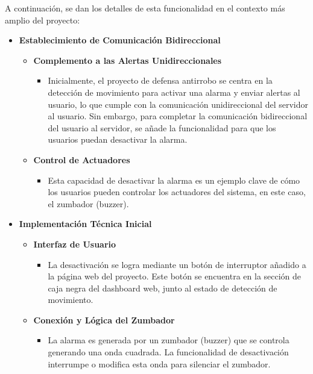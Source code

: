 \documentclass{report}
\begin{document}
A continuación, se dan los detalles de esta funcionalidad en el contexto más amplio del proyecto:
\begin{itemize}
    
    \item \textbf{Establecimiento de Comunicación Bidireccional}
    \begin{itemize}
        \item \textbf{Complemento a las Alertas Unidireccionales}
        \begin{itemize}
            \item Inicialmente, el proyecto de defensa antirrobo se centra en la detección de movimiento para activar una alarma y enviar alertas al usuario, 
            lo que cumple con la comunicación unidireccional del servidor al usuario. Sin embargo, para completar la comunicación bidireccional del usuario al 
            servidor, se añade la funcionalidad para que los usuarios puedan desactivar la alarma.
        \end{itemize}
        \item \textbf{Control de Actuadores}
        \begin{itemize}
            \item Esta capacidad de desactivar la alarma es un ejemplo clave de cómo los usuarios pueden controlar los actuadores del sistema, en este 
            caso, el zumbador (buzzer).
        \end{itemize}
    \end{itemize}

    \item \textbf{Implementación Técnica Inicial}
    \begin{itemize}
        \item \textbf{Interfaz de Usuario}
        \begin{itemize}
            \item La desactivación se logra mediante un botón de interruptor añadido a la página web del proyecto. Este botón se encuentra en la sección 
            de caja negra del dashboard web, junto al estado de detección de movimiento.
        \end{itemize}

        \item \textbf{Conexión y Lógica del Zumbador}
        \begin{itemize}
            \item La alarma es generada por un zumbador (buzzer) que se controla generando una onda cuadrada. La funcionalidad de desactivación interrumpe 
            o modifica esta onda para silenciar el zumbador.
        \end{itemize}


\end{itemize}
\end{itemize}
\end{document}
